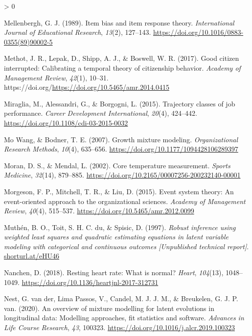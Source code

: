 \documentclass[
12pt, %
twoside,
english]{guelphthesis}
\newlength{\cslhangindent}
\newenvironment{CSLReferences}[2] %
 {%
  \setlength{\parindent}{0pt}
  \ifodd #1 \everypar{\setlength{\hangindent}{\cslhangindent}}\ignorespaces\fi
  \ifnum #2 > 0
  \setlength{\parskip}{\linespacing{2}}
  \fi
 }%
 {}
\begin{document}
\begin{CSLReferences}{1}{0}
\leavevmode{}%
Mellenbergh, G. J. (1989). Item bias and item response theory. \emph{International Journal of Educational Research}, \emph{13}(2), 127--143. \url{https://doi.org/10.1016/0883-0355(89)90002-5}

\leavevmode{}%
Methot, J. R., Lepak, D., Shipp, A. J., \& Boswell, W. R. (2017). Good citizen interrupted: Calibrating a temporal theory of citizenship behavior. \emph{Academy of Management Review}, \emph{42}(1), 10--31. https://doi.org/\url{https://doi.org/10.5465/amr.2014.0415}

\leavevmode{}%
Miraglia, M., Alessandri, G., \& Borgogni, L. (2015). Trajectory classes of job performance. \emph{Career Development International}, \emph{20}(4), 424--442. \url{https://doi.org/10.1108/cdi-03-2015-0032}

\leavevmode{}%
Mo Wang, \& Bodner, T. E. (2007). Growth mixture modeling. \emph{Organizational Research Methods}, \emph{10}(4), 635--656. \url{https://doi.org/10.1177/1094428106289397}

\leavevmode{}%
Moran, D. S., \& Mendal, L. (2002). Core temperature measurement. \emph{Sports Medicine}, \emph{32}(14), 879--885. \url{https://doi.org/10.2165/00007256-200232140-00001}

\leavevmode{}%
Morgeson, F. P., Mitchell, T. R., \& Liu, D. (2015). Event system theory: An event-oriented approach to the organizational sciences. \emph{Academy of Management Review}, \emph{40}(4), 515--537. \url{https://doi.org/10.5465/amr.2012.0099}

\leavevmode{}%
Muthén, B. O., Toit, S. H. C. du, \& Spisic, D. (1997). \emph{Robust inference using weighted least squares and quadratic estimating equations in latent variable modeling with categorical and continuous outcomes {\emph{{[}Unpublished technical report{]}}}}. \href{https://shorturl.at/eHU46}{shorturl.at/eHU46}

\leavevmode{}%
Nanchen, D. (2018). Resting heart rate: What is normal? \emph{Heart}, \emph{104}(13), 1048--1049. \url{https://doi.org/10.1136/heartjnl-2017-312731}

\leavevmode{}%
Nest, G. van der, Lima Passos, V., Candel, M. J. J. M., \& Breukelen, G. J. P. van. (2020). An overview of mixture modelling for latent evolutions in longitudinal data: Modelling approaches, fit statistics and software. \emph{Advances in Life Course Research}, \emph{43}, 100323. \url{https://doi.org/10.1016/j.alcr.2019.100323}


\end{CSLReferences}
\end{document}
